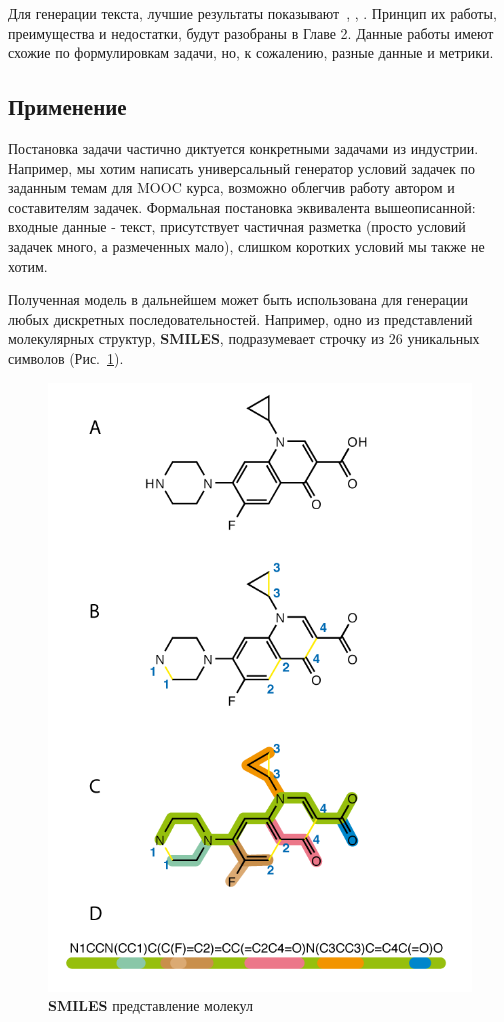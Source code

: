 \documentclass{spbau-diploma}
\begin{document}
Для генерации текста, лучшие результаты показывают~\cite{text_vae}, 
\cite{text_cvae}, \cite{leakgan}. Принцип их работы, преимущества и недостатки, 
будут разобраны в Главе 2. Данные работы имеют схожие по формулировкам задачи, 
но, к сожалению, разные данные и метрики.

\subsection{Применение}
Постановка задачи частично диктуется конкретными задачами из индустрии. 
Например, мы хотим написать универсальный генератор условий задачек по заданным 
темам для MOOC курса, возможно облегчив работу автором и составителям задачек.
Формальная постановка эквивалента вышеописанной: входные данные - текст,
присутствует частичная разметка (просто условий задачек много, а размеченных 
мало), слишком коротких условий мы также не хотим.

Полученная модель в дальнейшем может быть использована для генерации любых
дискретных последовательностей. Например, одно из представлений молекулярных 
структур, \textbf{SMILES}, подразумевает строчку из $26$ уникальных символов 
(Рис.~\ref{smiles}).

\begin{figure}[h]
\centering
\includegraphics{images/smiles.png}
\caption{\textbf{SMILES} представление молекул}
\label{smiles}
\end{figure}
\end{document}
